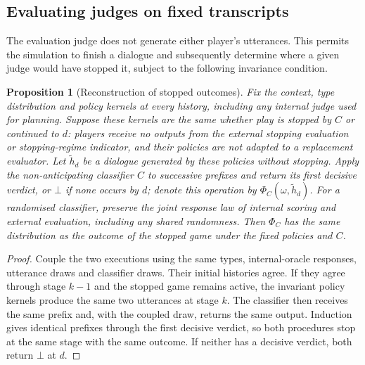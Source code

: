 \documentclass[10pt,a4paper]{article}
\newtheorem{proposition}{Proposition}
\theoremstyle{remark}
\newcommand{\Cont}{\bot}
\begin{document}
\subsection{Evaluating judges on fixed transcripts}
The evaluation judge does not generate either player's utterances. This permits the simulation to finish a dialogue
and subsequently determine where a given judge would have stopped it, subject to the following invariance condition.

\begin{proposition}[Reconstruction of stopped outcomes]\label{prop:decouple}
Fix the context, type distribution and policy kernels at every history, including any internal judge used for
planning. Suppose these kernels are the same whether play is stopped by $C$ or continued to $d$: players receive
no outputs from the external stopping evaluation or stopping-regime indicator, and their policies are not adapted
to a replacement evaluator.
Let $\tilde h_d$ be a dialogue generated by these policies without stopping. Apply the non-anticipating classifier
$C$ to successive prefixes and return its first decisive verdict, or $\Cont$ if none occurs by $d$; denote this
operation by $\Phi_C(\omega,\tilde h_d)$. For a randomised classifier, preserve the joint response law of
internal scoring and external evaluation, including any shared randomness. Then $\Phi_C$ has the same distribution as the outcome of the stopped
game under the fixed policies and $C$.
\end{proposition}
\begin{proof}
Couple the two executions using the same types, internal-oracle responses, utterance draws and classifier draws.
Their initial histories agree.
If they agree through stage $k-1$ and the stopped game remains active, the invariant policy kernels produce the same
two utterances at stage $k$. The classifier then receives the same prefix and, with the coupled draw, returns the
same output. Induction gives identical prefixes through the first decisive verdict, so both procedures stop at the
same stage with the same outcome. If neither has a decisive verdict, both return $\Cont$ at $d$.
\end{proof}
\end{document}
